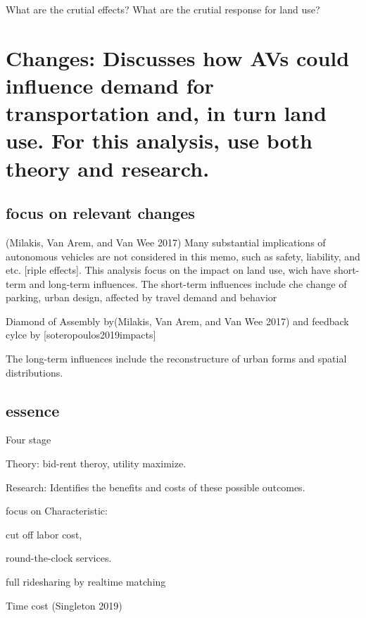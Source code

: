 \documentclass[12pt,]{article}
\begin{document}
What are the crutial effects? What are the crutial response for land
use?

\hypertarget{changes-discusses-how-avs-could-influence-demand-for-transportation-and-in-turn-land-use.-for-this-analysis-use-both-theory-and-research.}{%
\section{Changes: Discusses how AVs could influence demand for
transportation and, in turn land use. For this analysis, use both theory
and
research.}\label{changes-discusses-how-avs-could-influence-demand-for-transportation-and-in-turn-land-use.-for-this-analysis-use-both-theory-and-research.}}

\hypertarget{focus-on-relevant-changes}{%
\subsection{focus on relevant changes}\label{focus-on-relevant-changes}}

(Milakis, Van Arem, and Van Wee 2017) Many substantial implications of
autonomous vehicles are not considered in this memo, such as safety,
liability, and etc. {[}riple effects{]}. This analysis focus on the
impact on land use, wich have short-term and long-term influences. The
short-term influences include che change of parking, urban design,
affected by travel demand and behavior

Diamond of Assembly by(Milakis, Van Arem, and Van Wee 2017) and feedback
cylce by {[}soteropoulos2019impacts{]}

The long-term influences include the reconstructure of urban forms and
spatial distributions.

\hypertarget{essence}{%
\subsection{essence}\label{essence}}

Four stage

Theory: bid-rent theroy, utility maximize.

Research: Identifies the benefits and costs of these possible outcomes.

focus on Characteristic:

cut off labor cost,

round-the-clock services.

full ridesharing by realtime matching

Time cost (Singleton 2019)
\end{document}
